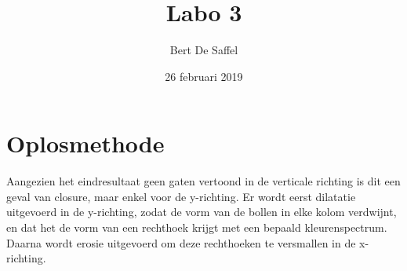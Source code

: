 \documentclass{article}
\begin{document}
	\title{Labo 3}
	\author{Bert De Saffel}
	\date{26 februari 2019}
	\maketitle
	
	\section{Oplosmethode}
	Aangezien het eindresultaat geen gaten vertoond in de verticale richting is dit een geval van closure, maar enkel voor de y-richting. Er wordt eerst dilatatie uitgevoerd in de y-richting, zodat de vorm van de bollen in elke kolom verdwijnt, en dat het de vorm van een rechthoek krijgt met een bepaald kleurenspectrum. Daarna wordt erosie uitgevoerd om deze rechthoeken te versmallen in de x-richting.
	
\end{document}
